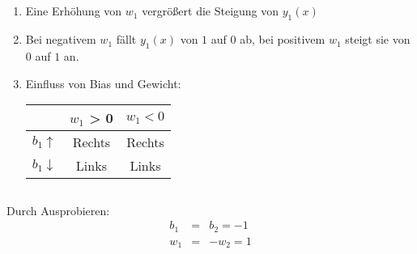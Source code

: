 \documentclass[DIN, pagenumber=false, fontsize=11pt, parskip=half]{scrartcl}
\begin{document}
    \subsection{}
    \begin{enumerate}[label=(\alph*)]
        \item Eine Erhöhung von $w_1$ vergrößert die Steigung von $y_1(x)$
        \item Bei negativem $w_1$ fällt $y_1(x)$ von $1$ auf $0$ ab, bei positivem $w_1$ steigt sie von $0$ auf $1$ an.
        \item Einfluss von Bias und Gewicht:
            \begin{table}[H]
                \centering
                \begin{tabular}{ccc}
                    \toprule
                     & $w_1$ > 0 & $w_1 < 0$ \\
                     \midrule
                     $b_1 \uparrow $ & Rechts & Rechts\\
                     $b_1 \downarrow$ & Links & Links\\
                     \bottomrule
                \end{tabular}
            \end{table}
    \end{enumerate}
    \subsection{}
    Durch Ausprobieren:
    \begin{eqnarray*}
        b_1 &=& b_2 = -1 \\
        w_1 &=& -w_2 = 1 \\
    \end{eqnarray*}
\end{document}
